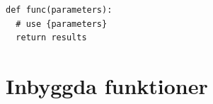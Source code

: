 \begin{frame}[fragile]
  \begin{lstlisting}[basicstyle=\huge,numbers=none]
def func(parameters):
  # use {parameters}
  return results
  \end{lstlisting}
\end{frame}

\begin{frame}[fragile]
  \begin{example}[summera.py]
    
  \end{example}
\end{frame}

\begin{frame}[fragile]
  \begin{example}
    
  \end{example}
\end{frame}

\begin{frame}[fragile]
  \begin{example}
    
  \end{example}
\end{frame}

\begin{frame}[fragile]
  \begin{example}
    
  \end{example}
\end{frame}

\begin{frame}[fragile]
  \begin{example}
    
  \end{example}
\end{frame}


\section{Inbyggda funktioner}

